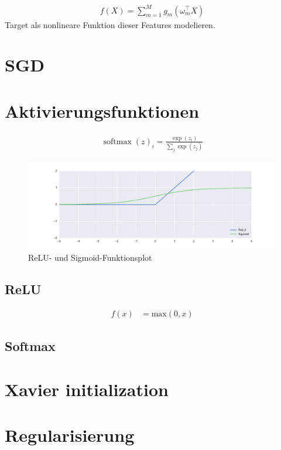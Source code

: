 \begin{align}
    f(X)=\sum\limits_{m=1}^{M}g_{m}\left(\omega_{m}^{\top}X\right)
   \end{align}
Target als nonlineare Funktion dieser Features modelieren.  


\section{SGD}

\section{Aktivierungsfunktionen}
\begin{align}
    \operatorname{softmax}(z)_{i}=\frac{\exp\left(z_{i}\right)}{ \sum _ { j } \exp \left( z _ { j } \right) }
\end{align}
\begin{figure}
    \caption{ReLU- und Sigmoid-Funktionsplot}
    \includegraphics[width=\textwidth]{figures/plot/relu_sigmoid.pdf}
\end{figure}

\subsection{ReLU}
\begin{align}
    f\left(x\right) &= \text{max}(0,x)
\end{align}
\subsection{Softmax}


\section{Xavier initialization}

\section{Regularisierung}
\label{sec:Regularisierung}
